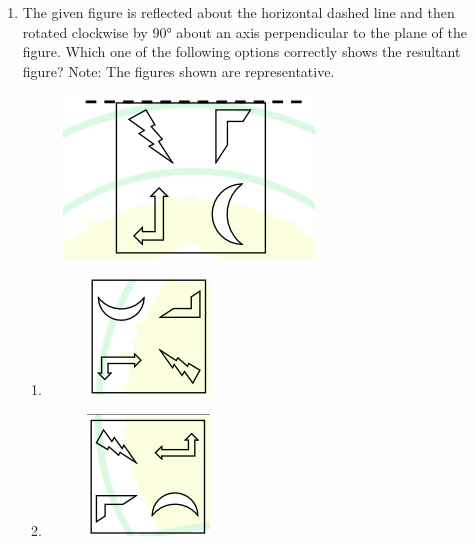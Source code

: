\documentclass[a4paper,10pt]{article}
\begin{document}
\begin{enumerate}
    \item The given figure is reflected about the horizontal dashed line and then rotated clockwise by 90° about an axis perpendicular to the plane of the figure. Which one of the following options correctly shows the resultant figure? Note: The figures shown are representative.\\
    \begin{figure}[h!]
    \centering
    \includegraphics[width=0.5\columnwidth]{figs/01.jpg}
    \caption{}
    \label{fig:Img01}
    \end{figure}
    \begin{multicols}{2}
    \begin{enumerate}
        \item \begin{figure}[H]
    \centering
    \includegraphics[width=0.5\columnwidth]{figs/02.jpg}
    \caption{}
    \label{fig:Img02}
    \end{figure}
        \item \begin{figure}[H]
    \centering
    \includegraphics[width=0.5\columnwidth]{figs/03.jpg}

\end{figure}
\end{enumerate}
\end{multicols}
\end{enumerate}
\end{document}

